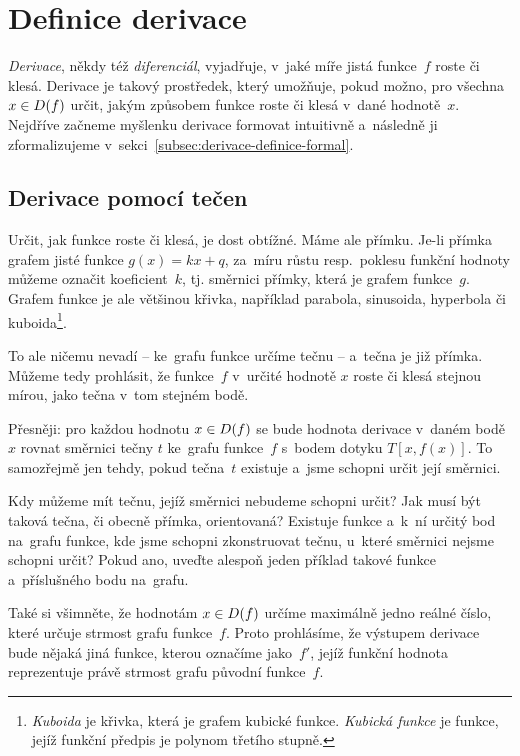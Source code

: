 \section{Definice derivace}
\label{sec:derivace-definice}

\emph{Derivace}, někdy též \emph{diferenciál}, vyjadřuje, v~jaké míře jistá
funkce~$f$ roste či klesá. Derivace je takový prostředek, který umožňuje, pokud
možno, pro všechna ${x \in D(f)}$ určit, jakým způsobem funkce roste či
klesá v~dané hodnotě~$x$. Nejdříve začneme myšlenku derivace formovat intuitivně
a~následně ji zformalizujeme v~sekci~\ref{subsec:derivace-definice-formal}.

\subsection{Derivace pomocí tečen}
\label{subsec:derivace-pomoci-tecen}

Určit, jak funkce roste či klesá, je dost obtížné.
Máme ale přímku.
Je-li přímka grafem jisté funkce ${g(x) = kx + q}$, za~míru růstu resp.~poklesu
funkční hodnoty můžeme označit koeficient~$k$, tj. směrnici přímky, která je grafem
funkce~$g$.
Grafem funkce je ale většinou křivka, například parabola, sinusoida, hyperbola či
kuboida\footnote{\emph{Kuboida} je křivka, která je grafem kubické funkce.
\emph{Kubická funkce} je funkce, jejíž funkční předpis je polynom třetího stupně.}.

To ale ničemu nevadí -- ke~grafu funkce určíme tečnu -- a~tečna je již přímka.
Můžeme tedy prohlásit, že funkce~$f$ v~určité hodnotě $x$ roste či klesá stejnou
mírou, jako tečna v~tom stejném bodě.

Přesněji: pro každou hodnotu ${x \in D(f)}$ se bude hodnota derivace v~daném
bodě~$x$ rovnat směrnici tečny $t$ ke~grafu funkce~$f$ s~bodem dotyku $T[x, f(x)]$.
To samozřejmě jen tehdy, pokud tečna~$t$ existuje a~jsme schopni určit její směrnici.

\begin{exercise}
    Kdy můžeme mít tečnu, jejíž směrnici nebudeme schopni určit? Jak musí být taková
    tečna, či obecně přímka, orientovaná? Existuje funkce a~k~ní určitý bod na~grafu
    funkce, kde jsme schopni zkonstruovat tečnu, u~které směrnici nejsme schopni
    určit? Pokud ano, uveďte alespoň jeden příklad takové funkce a~příslušného bodu
    na~grafu.
\end{exercise}

Také si všimněte, že hodnotám ${x \in D(f)}$ určíme maximálně jedno reálné
číslo, které určuje strmost grafu funkce~$f$.
Proto prohlásíme, že výstupem derivace bude nějaká jiná funkce, kterou označíme
jako~$f'$, jejíž funkční hodnota reprezentuje právě strmost grafu původní funkce~$f$.

